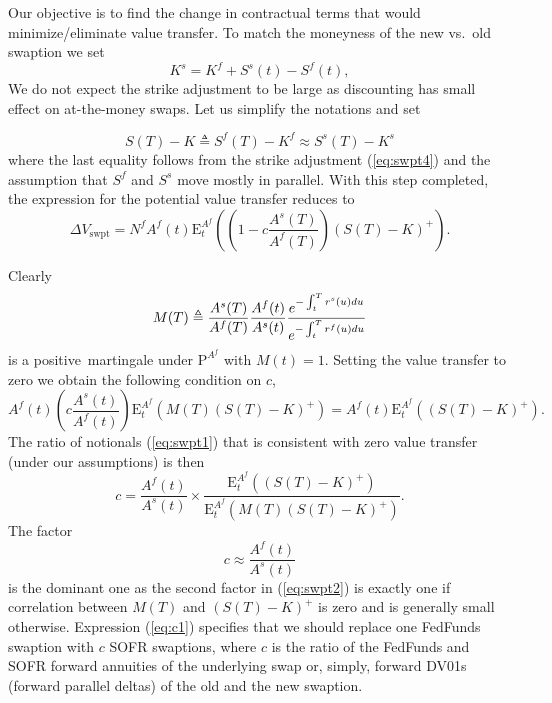 \documentclass{article}
\begin{document}
Our objective is to find the change in contractual terms that would
minimize/eliminate value transfer. To match the moneyness of the new vs.~old
swaption we set%
\begin{equation}
K^{s}=K^{f}+S^{s}(t)-S^{f}(t),  \label{eq:swpt4}
\end{equation}%
We do not expect the strike adjustment to be large as discounting has small
effect on at-the-money swaps. Let us simplify the notations and set

\begin{equation*}
S(T)-K\triangleq S^{f}(T)-K^{f}\approx S^{s}(T)-K^{s}
\end{equation*}%
where the last equality follows from the strike adjustment (\ref{eq:swpt4})
and the assumption that $S^{f}$ and $S^{s}$ move mostly in parallel. With
this step completed, the expression for the potential value transfer reduces
to%
\begin{equation*}
\Delta V_{\mathrm{swpt}}=N^{f}A^{f}(t)\mathrm{E}_{t}^{A^{f}}\left( \left( 1-c%
\frac{A^{s}(T)}{A^{f}(T)}\right) \left( S(T)-K\right) ^{+}\right) .
\end{equation*}

Clearly 
\begin{equation*}
M(T)\triangleq \frac{A^{s}(T)}{A^{f}(T)}\frac{A^{f}(t)}{A^{s}(t)}\frac{%
e^{-\int_{t}^{T}r^{s}(u)du}}{e^{-\int_{t}^{T}r^{f}(u)du}}
\end{equation*}
is a positive\ martingale under $\mathrm{P}^{A^{f}}$ with $M(t)=1.$ Setting
the value transfer to zero we obtain the following condition on $c$,%
\begin{equation*}
A^{f}(t)\left( c\frac{A^{s}(t)}{A^{f}(t)}\right) \mathrm{E}%
_{t}^{A^{f}}\left( M(T)(S(T)-K)^{+}\right) =A^{f}(t)\mathrm{E}%
_{t}^{A^{f}}\left( (S(T)-K)^{+}\right) .
\end{equation*}%
The ratio of notionals (\ref{eq:swpt1}) that is consistent with zero value
transfer (under our assumptions) is then%
\begin{equation}
c=\frac{A^{f}(t)}{A^{s}(t)}\times \frac{\mathrm{E}_{t}^{A^{f}}\left(
(S(T)-K)^{+}\right) }{\mathrm{E}_{t}^{A^{f}}\left( M(T)(S(T)-K)^{+}\right) }.
\label{eq:swpt2}
\end{equation}%
The factor 
\begin{equation}
c\approx \frac{A^{f}(t)}{A^{s}(t)}  \label{eq:c1}
\end{equation}%
is the dominant one as the second factor in (\ref{eq:swpt2}) is exactly one
if correlation between $M(T)$ and $(S(T)-K)^{+}$ is zero and is generally
small otherwise. Expression (\ref{eq:c1}) specifies that we should replace
one FedFunds swaption with $c$ SOFR swaptions, where $c$ is the ratio of the
FedFunds and SOFR forward annuities of the underlying swap or, simply,
forward DV01s (forward parallel deltas) of the old and the new swaption.
\end{document}
